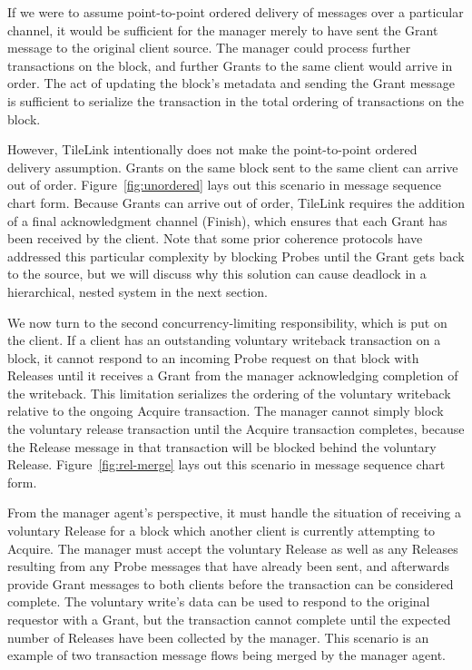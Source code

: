 If we were to assume point-to-point ordered delivery of messages over a particular channel,
it would be sufficient for the manager merely to have sent the Grant message to the original client source.
The manager could process further transactions on the block, and further Grants to the same client would arrive in order.
The act of updating the block's metadata and sending the Grant message is sufficient to serialize the transaction in the total ordering of transactions on the block.

However, TileLink intentionally does not make the point-to-point ordered delivery assumption.
Grants on the same block sent to the same client can arrive out of order.
Figure~\ref{fig:unordered} lays out this scenario in message sequence chart form.
Because Grants can arrive out of order, TileLink requires the addition of a final acknowledgment channel (Finish), which ensures that each Grant has been received by the client.
Note that some prior coherence protocols have addressed this particular complexity by blocking Probes until the Grant gets back to the source, but we will discuss why this solution can
cause deadlock in a hierarchical, nested system in the next section.

We now turn to the second concurrency-limiting responsibility, which is put on the client.
If a client has an outstanding voluntary writeback transaction on a block,
it cannot respond to an incoming Probe request on that block with Releases until it receives a Grant from the manager acknowledging completion of the writeback.
This limitation serializes the ordering of the voluntary writeback relative to the ongoing Acquire transaction.
The manager cannot simply block the voluntary release transaction until the Acquire transaction completes, because the Release message in that transaction will be
blocked behind the voluntary Release.
Figure~\ref{fig:rel-merge} lays out this scenario in message sequence chart form.

From the manager agent's perspective, it must handle the situation of receiving a voluntary Release for a block which another client is currently attempting to Acquire.
The manager must accept the voluntary Release as well as any Releases resulting from any Probe messages that have already been sent, and afterwards provide Grant messages to both clients before the transaction can be considered complete.
The voluntary write's data can be used to respond to the original requestor with a Grant, but the transaction cannot complete until the expected number of Releases
have been collected by the manager.
This scenario is an example of two transaction message flows being merged by the manager agent.

